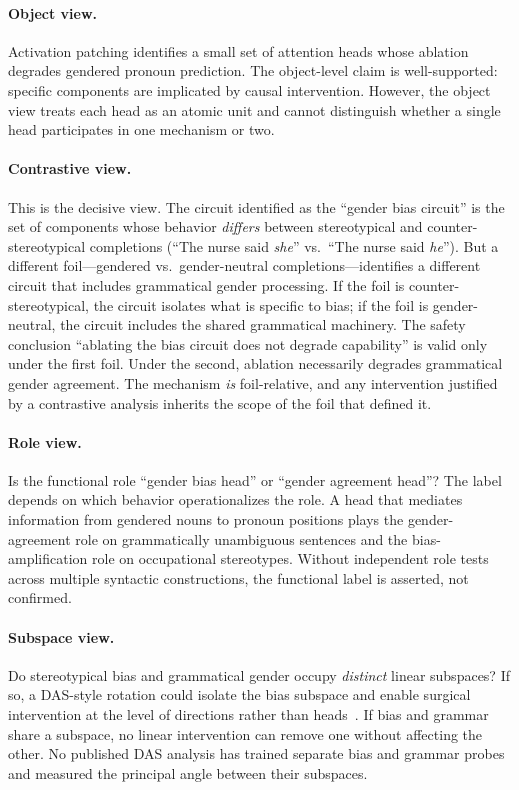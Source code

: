 \documentclass{article}
\begin{document}
\paragraph{Object view.}
Activation patching identifies a small set of attention heads whose
ablation degrades gendered pronoun prediction. The object-level claim is
well-supported: specific components are implicated by causal
intervention. However, the object view treats each head as an atomic unit
and cannot distinguish whether a single head participates in one
mechanism or two.

\paragraph{Contrastive view.}
This is the decisive view. The circuit identified as the ``gender bias
circuit'' is the set of components whose behavior \emph{differs} between
stereotypical and counter-stereotypical completions (``The nurse said
\emph{she}'' vs.\ ``The nurse said \emph{he}''). But a different
foil---gendered vs.\ gender-neutral completions---identifies a different
circuit that includes grammatical gender processing. If the foil is
counter-stereotypical, the circuit isolates what is specific to bias; if
the foil is gender-neutral, the circuit includes the shared grammatical
machinery. The safety conclusion ``ablating the bias circuit does not
degrade capability'' is valid only under the first foil. Under the
second, ablation necessarily degrades grammatical gender agreement. The
mechanism \emph{is} foil-relative, and any intervention justified by a
contrastive analysis inherits the scope of the foil that defined it.

\paragraph{Role view.}
Is the functional role ``gender bias head'' or ``gender agreement head''?
The label depends on which behavior operationalizes the role. A head that
mediates information from gendered nouns to pronoun positions plays the
gender-agreement role on grammatically unambiguous sentences and the
bias-amplification role on occupational stereotypes. Without independent
role tests across multiple syntactic constructions, the functional label
is asserted, not confirmed.

\paragraph{Subspace view.}
Do stereotypical bias and grammatical gender occupy \emph{distinct}
linear subspaces? If so, a DAS-style rotation could isolate the bias
subspace and enable surgical intervention at the level of directions
rather than heads~\citep{li2023iti}. If bias and grammar share a
subspace, no linear intervention can remove one without affecting the
other. No published DAS analysis has trained separate bias and grammar
probes and measured the principal angle between their subspaces.
\end{document}
